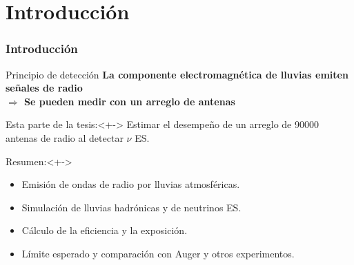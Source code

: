 \section{Introducci\'on}

\begin{frame}
\frametitle{Introducci\'on}
 \footnotesize
 \begin{exampleblock}{Principio de detecci\'on}
  \centering
  \textbf{La componente electromagn\'etica de lluvias emiten se\~nales de radio\\ \alert{$\bm\Rightarrow$ Se pueden medir con un arreglo de antenas}}
 \end{exampleblock}
 
 \begin{alertblock}{Esta parte de la tesis:}<+->
  Estimar el desempe\~no de un arreglo de 90000 antenas de radio al detectar $\nu$ ES.
 \end{alertblock}
 
 \begin{block}{Resumen:}<+->
  \begin{itemize}[<alert@+>]\setlength\itemsep{2mm}
   \item Emisi\'on de ondas de radio por lluvias atmosf\'ericas.
   \item Simulaci\'on de lluvias hadr\'onicas y de neutrinos ES.
   \item C\'alculo de la eficiencia y la exposici\'on.
   \item L\'imite esperado y comparaci\'on con Auger y otros experimentos.
  \end{itemize}
 \end{block}
% 
\end{frame}


